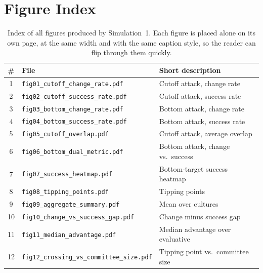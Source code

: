 \documentclass[11pt,a4paper]{article}
\begin{document}
\section{Figure Index}

\begin{table}[H]
  \centering
  \caption{Index of all figures produced by Simulation~1. Each figure is
  placed alone on its own page, at the same width and with the same caption
  style, so the reader can flip through them quickly.}
  \label{tab:figindex}
  \begin{tabular}{@{}clp{6.5cm}@{}}
    \toprule
    \# & File & Short description \\
    \midrule
    1  & \texttt{fig01\_cutoff\_change\_rate.pdf}          & Cutoff attack, change rate \\
    2  & \texttt{fig02\_cutoff\_success\_rate.pdf}         & Cutoff attack, success rate \\
    3  & \texttt{fig03\_bottom\_change\_rate.pdf}          & Bottom attack, change rate \\
    4  & \texttt{fig04\_bottom\_success\_rate.pdf}         & Bottom attack, success rate \\
    5  & \texttt{fig05\_cutoff\_overlap.pdf}               & Cutoff attack, average overlap \\
    6  & \texttt{fig06\_bottom\_dual\_metric.pdf}          & Bottom attack, change vs.\ success \\
    7  & \texttt{fig07\_success\_heatmap.pdf}              & Bottom-target success heatmap \\
    8  & \texttt{fig08\_tipping\_points.pdf}               & Tipping points \\
    9  & \texttt{fig09\_aggregate\_summary.pdf}            & Mean over cultures \\
    10 & \texttt{fig10\_change\_vs\_success\_gap.pdf}      & Change minus success gap \\
    11 & \texttt{fig11\_median\_advantage.pdf}             & Median advantage over evaluative \\
    12 & \texttt{fig12\_crossing\_vs\_committee\_size.pdf} & Tipping point vs.\ committee size \\
    \bottomrule
  \end{tabular}
\end{table}
\end{document}
